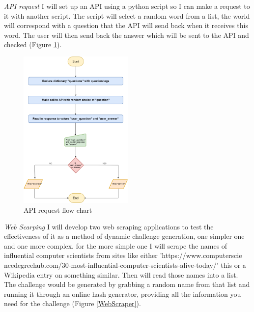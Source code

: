 \documentclass[12pt,a4paper]{article}
\begin{document}
\emph{API request} 
I will set up an API using a python script so I can make a request to it with another script. The script will select a random word from a list, the world will correspond with a question that the API will send back when it receives this word. The user will then send back the answer which will be sent to the API and checked (Figure \ref{APIRequest}).   

\begin{figure}[h]
    \centering
    \includegraphics[width=0.5\textwidth]{Figs/API_request.png} 
    \caption{API request flow chart} 
    \label{APIRequest}
\end{figure}   


\emph{Web Scarping} 
I will develop two web scraping applications to test the effectiveness of it as a method of dynamic challenge generation, one simpler one and one more complex. for the more simple one I will scrape the names of influential computer scientists from sites like either 'https://www.computerscie
ncedegreehub.com/30-most-influential-computer-scientists-alive-today/' this or a Wikipedia entry on something similar. Then will read those names into a list. The challenge would be generated by grabbing a random name from that list and running it through an online hash generator, providing all the information you need for the challenge (Figure \ref{WebScraper}).   
\end{document}
